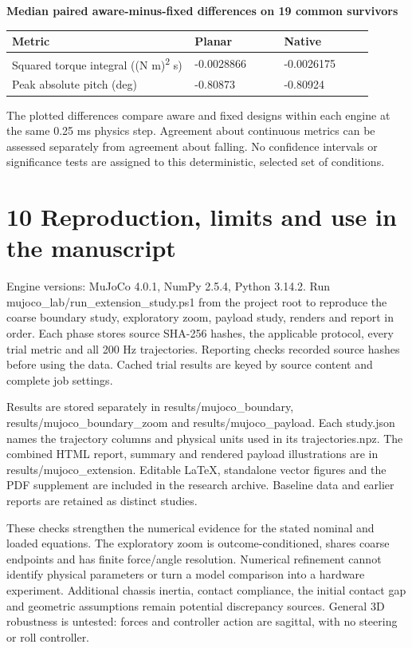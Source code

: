 \documentclass[11pt,a4paper]{article}
\begin{document}
\textbf{Median paired aware-minus-fixed differences on 19 common survivors}
\begin{longtable}{p{0.45\linewidth}p{0.225\linewidth}p{0.225\linewidth}}
\toprule
Metric & Planar & Native \\ \midrule \endhead
Squared torque integral ((N m)\textsuperscript{2} s) & -0.0028866 & -0.0026175 \\
Peak absolute pitch (deg) & -0.80873 & -0.80924 \\
\bottomrule
\end{longtable}
The plotted differences compare aware and fixed designs within each engine at the same 0.25 ms physics step. Agreement about continuous metrics can be assessed separately from agreement about falling. No confidence intervals or significance tests are assigned to this deterministic, selected set of conditions.

\clearpage
\section*{10 Reproduction, limits and use in the manuscript}
Engine versions: MuJoCo 4.0.1, NumPy 2.5.4, Python 3.14.2. Run mujoco\_lab/run\_extension\_study.ps1 from the project root to reproduce the coarse boundary study, exploratory zoom, payload study, renders and report in order. Each phase stores source SHA-256 hashes, the applicable protocol, every trial metric and all 200 Hz trajectories. Reporting checks recorded source hashes before using the data. Cached trial results are keyed by source content and complete job settings.

Results are stored separately in results/mujoco\_boundary, results/mujoco\_boundary\_zoom and results/mujoco\_payload. Each study.json names the trajectory columns and physical units used in its trajectories.npz. The combined HTML report, summary and rendered payload illustrations are in results/mujoco\_extension. Editable LaTeX, standalone vector figures and the PDF supplement are included in the research archive. Baseline data and earlier reports are retained as distinct studies.

These checks strengthen the numerical evidence for the stated nominal and loaded equations. The exploratory zoom is outcome-conditioned, shares coarse endpoints and has finite force/angle resolution. Numerical refinement cannot identify physical parameters or turn a model comparison into a hardware experiment. Additional chassis inertia, contact compliance, the initial contact gap and geometric assumptions remain potential discrepancy sources. General 3D robustness is untested: forces and controller action are sagittal, with no steering or roll controller.
\end{document}
